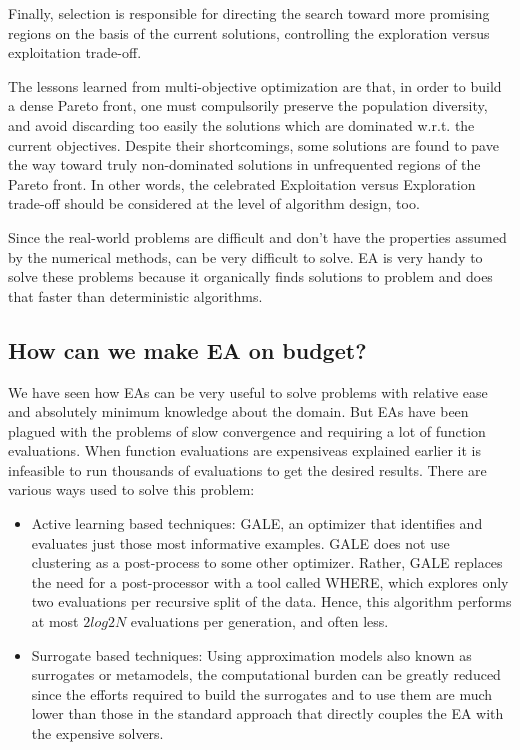 \documentclass{newsig}
\begin{document}
Finally, selection is responsible for directing the search toward more promising regions on
the basis of the current solutions, controlling the exploration versus exploitation trade-off.

The lessons learned from multi-objective optimization are that, in order to build a
dense Pareto front, one must compulsorily preserve the population diversity, and avoid
discarding too easily the solutions which are dominated w.r.t. the current objectives.
Despite their shortcomings, some solutions are found to pave the way toward truly non-dominated
solutions in unfrequented regions of the Pareto front. In other words, the
celebrated Exploitation versus Exploration trade-off should be considered at the level of
algorithm design, too.

\begin{myshadowbox}
    Since the real-world problems are difficult and don't have the properties assumed by the numerical methods, can be very difficult to solve. EA is very handy to solve these problems because it organically finds solutions to problem and does that faster than deterministic algorithms.
\end{myshadowbox}



\subsection*{How can we make EA on budget?}\label{section:frugal}
We have seen how EAs can be very useful to solve problems with relative ease and absolutely minimum knowledge about the domain. But EAs have been plagued with the problems of slow convergence and requiring a lot of function evaluations. When function evaluations are \textquotesingle expensive\textquotesingle as explained earlier it is infeasible to run thousands of evaluations  to get the desired results. There are various ways used to solve this problem:
\begin{itemize}
\item{Active learning based techniques: GALE, an optimizer that identifies and evaluates just
those most informative examples. 
GALE does not use clustering as a post-process to some
other optimizer. Rather, GALE replaces the need for a
post-processor with a tool called WHERE, which explores only two evaluations per recursive split of the
data. Hence, this algorithm performs at most $2log 2N$
evaluations per generation, and often less.}
\item{Surrogate based techniques: Using approximation models
also known as surrogates or metamodels, the computational
burden can be greatly reduced since the efforts required to
build the surrogates and to use them are much lower than
those in the standard approach that directly couples the EA
with the expensive solvers.}
\end{itemize}
\end{document}
